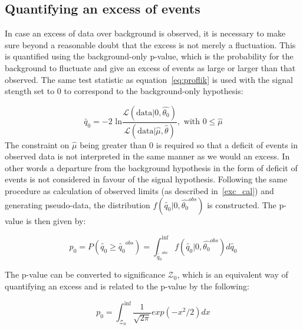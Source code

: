 \subsection{Quantifying an excess of events}
\label{theo_uncert}
In case an excess of data over background is observed, it is necessary to make sure beyond a reasonable doubt that the excess is not merely a fluctuation. This is quantified using the background-only p-value, which is the probability for the background to fluctuate and give an excess of events as large or larger than that observed. The same test statistic as equation~\ref{eq:proflik} is used with the signal stength set to 0 to correspond to the background-only hypothesis:

\begin{equation}
\label{eq:proflik_b}
  \tilde{q_0}=-2\text{ ln}\frac{\mathcal{L}(\text{data}|0,\hat{\theta_0})}{\mathcal{L}(\text{data}|\hat{\mu},\hat{\theta})},\text{   with  } 0\leq\hat{\mu} 
\end{equation}
The constraint on $\hat\mu$ being greater than 0 is required so that a deficit of events in observed data is not interpreted in the same manner as we would an excess. In other words a departure from the background hypothesis in the form of deficit of events is not considered in favour of the signal hypothesis. Following the same procedure as calculation of observed limits (as described in~\ref{exc_cal}) and generating pseudo-data, the distribution $f(\tilde{q_0}|0,\hat{\theta_{0}}^{obs})$ is constructed. The p-value is then given by:

\begin{equation}                                                                                                                          
  \label{eq:p0}                                                     
  p_0=P(\tilde{q_0}\geq \tilde{q_0}^{obs})=\int_{\tilde{q_0}^{obs}}^{\inf}f(\tilde{q_0}|0,\hat{\theta_0}^{obs})d\tilde{q_0}               \end{equation}

The p-value can be converted to significance $\mathcal{Z}_0$, which is an equivalent way of quantifying an excess and is related to the p-value by the following:

\begin{equation}                                                                                                                          
  \label{eq:sig}                                                                                                                           p_0=\int_{\mathcal{Z}_0}^{\inf}\frac{1}{\sqrt{2\pi}}exp(-x^2/2)dx
\end{equation}

